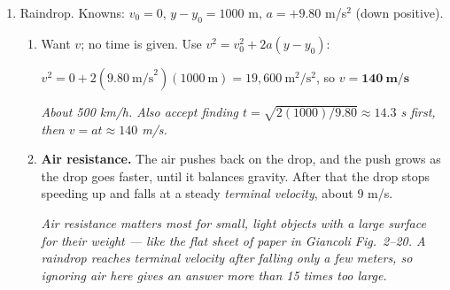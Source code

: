 \documentclass[12pt, twoside]{article}
\begin{document}
\begin{enumerate}[itemsep=0.5cm]
\begin{enumerate}[itemsep=0.3cm]
      \emph{Also accept $v^2 = v_0^2 + 2a(y - y_0)$:
      $y - y_0 = \frac{0 - (14.7)^2}{2(-9.80)} = \frac{-216.09}{-19.6} = 11.025$ m.}
    \item \textbf{3.00 s.} The fall back down takes as long as the rise:
      $2 \times 1.50~\text{s} = 3.00$ s.

      $v = v_0 + at = 14.7~\text{m/s} + (-9.80~\text{m/s}^2)(3.00~\text{s})
      = \mathbf{-14.7~\textbf{m/s}}$, that is, 14.7 m/s \textbf{downward}.

      \emph{The ball returns at the speed it was thrown, in the opposite direction;
      the minus sign carries the direction. Also accept setting $y = 0$ in
      $y = v_0 t + \frac{1}{2}at^2$: $0 = (14.7 - 4.90\,t)\,t$, so $t = 0$ or
      $t = 3.00$ s (Giancoli Example 2--13).}
  \end{enumerate}

\item Raindrop. Knowns: $v_0 = 0$, $y - y_0 = 1000$ m, $a = +9.80$ m/s$^2$ (down
  positive).
  \begin{enumerate}[itemsep=0.3cm]
    \item Want $v$; no time is given. Use $v^2 = v_0^2 + 2a(y - y_0)$:

      $v^2 = 0 + 2(9.80~\text{m/s}^2)(1000~\text{m}) = 19{,}600~\text{m}^2/\text{s}^2$,
      \quad so $v = \mathbf{140~\textbf{m/s}}$

      \emph{About 500 km/h. Also accept finding $t = \sqrt{2(1000)/9.80}
      \approx 14.3$ s first, then $v = at \approx 140$ m/s.}
    \item \textbf{Air resistance.} The air pushes back on the drop, and the push
      grows as the drop goes faster, until it balances gravity. After that the drop
      stops speeding up and falls at a steady \emph{terminal velocity}, about 9 m/s.

      \emph{Air resistance matters most for small, light objects with a large
      surface for their weight --- like the flat sheet of paper in Giancoli
      Fig.\ 2--20. A raindrop reaches terminal velocity after falling only a few
      meters, so ignoring air here gives an answer more than 15 times too large.}
  \end{enumerate}

\end{enumerate}
\end{document}
